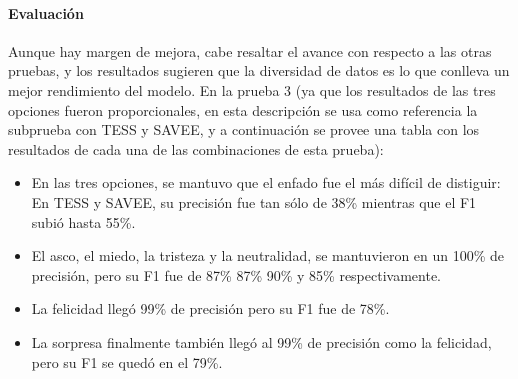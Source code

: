 \documentclass[11pt,a4paper,spanish]{book}
\begin{document}
	\paragraph{Evaluación}
	Aunque hay margen de mejora, cabe resaltar el avance con respecto a las otras pruebas, y los resultados sugieren que la diversidad de datos es lo que conlleva un mejor rendimiento del modelo. En la prueba 3 (ya que los resultados de las tres opciones fueron proporcionales, en esta descripción se usa como referencia la subprueba con TESS y SAVEE, y a continuación se provee una tabla con los resultados de cada una de las combinaciones de esta prueba):
	
	\begin{itemize}
		\item En las tres opciones, se mantuvo que el enfado fue el más difícil de distiguir: En TESS y SAVEE, su precisión fue tan sólo de 38\% mientras que el F1 subió hasta 55\%.
		
		\item El asco, el miedo, la tristeza y la neutralidad, se mantuvieron en un 100\% de precisión, pero su F1 fue de 87\% 87\% 90\% y 85\% respectivamente.
		
		\item La felicidad llegó 99\% de precisión pero su F1 fue de 78\%.
		
		\item La sorpresa finalmente también llegó al 99\% de precisión como la felicidad, pero su F1 se quedó en el 79\%.
	\end{itemize}
\end{document}
